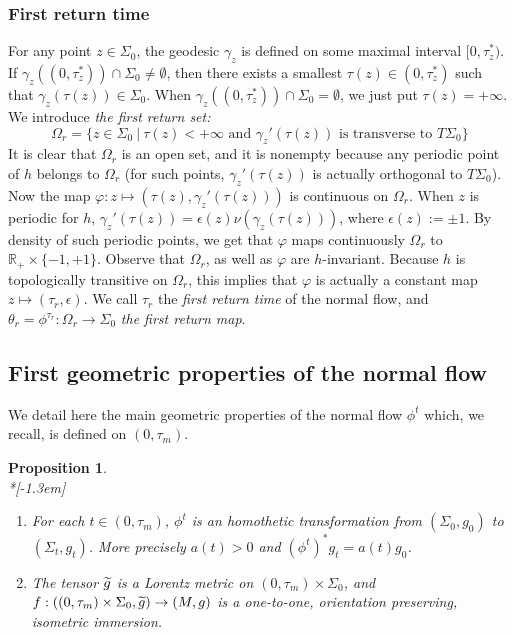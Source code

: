 \documentclass[11pt]{article}
\newtheorem{prop}[theo]{Proposition}
\theoremstyle{definition}
\numberwithin{equation}{section}
\numberwithin{figure}{section}
\numberwithin{table}{section}
\newcommand*\RR{\mathbb{R}}
\let\oldtilde\tilde
\renewcommand*\tilde[1]{\mathchoice{\widetilde{#1}}{\widetilde{#1}}{\widetilde{#1}}{\oldtilde{#1}}}
\begin{document}
\subsubsection{First return time}\label{sec.first}
For any point $z \in \Sigma_0$, the geodesic $\gamma_z$ is defined on some maximal interval $[0,\tau_z^*)$. If $\gamma_z((0,\tau_z^*)) \cap \Sigma_0 \not = \emptyset$, then there exists a smallest $\tau(z) \in (0,\tau_z^*)$ such that $\gamma_z(\tau(z)) \in \Sigma_0$. When $\gamma_z((0,\tau_z^*)) \cap \Sigma_0 = \emptyset$, we just put $\tau(z)=+ \infty$. We introduce \emph{the first return set:}
\[
\Omega_r= \{ z \in \Sigma_0\ | \ \tau(z)<+ \infty \text{ and } \gamma_z'(\tau(z)) \text{ is transverse to }T\Sigma_0 \}
\]
It is clear that $\Omega_r$ is an open set, and it is nonempty because any periodic point of $h$ belongs to $\Omega_r$ (for such points, $\gamma_z'(\tau(z))$ is actually orthogonal to $T\Sigma_0$). Now the map $\varphi: z \mapsto (\tau(z), \gamma_z'(\tau(z)))$ is continuous on $\Omega_r$. When $z$ is periodic for $h$, $\gamma_z'(\tau(z))=\epsilon(z) \nu(\gamma_z(\tau(z)))$, where $\epsilon(z):=\pm 1$. By density of such periodic points, we get that $\varphi$ maps continuously $\Omega_r$ to $\RR_+ \times \{-1,+1\}$. Observe that $\Omega_r$, as well as $\varphi$ are $h$-invariant. Because $h$ is topologically transitive on $\Omega_r$, this implies that $\varphi$ is actually a constant map $z \mapsto (\tau_r,\epsilon)$. We call $\tau_r$ the \emph{first return time} of the normal flow, and $\theta_r=\phi^{\tau_r}: \Omega_r \to \Sigma_0$ \emph{the first return map}.



\subsection{First geometric properties of the normal flow}\label{sec.geometric.properties}
We detail here the main geometric properties of the normal flow $\phi^t$ which, we recall, is defined on $(0,\tau_m)$.


\begin{prop}\label{fact.lorentz}\ \\*[-1.3em]
\begin{enumerate}
\item \label{5.5.1}For each $t \in (0,\tau_m)$, $\phi^t$ is an homothetic transformation from $(\Sigma_0,g_0)$ to $(\Sigma_t,g_t)$. More precisely $a(t)>0$ and $(\phi^t)^*g_t=a(t)g_0$.
\item \label{5.5.2}The tensor $\tilde{g}$ is a Lorentz metric on $(0,\tau_m) \times \Sigma_0$, and $f: ((0,\tau_m) \times \Sigma_0, \tilde{g}) \to (M,g)$ is a one-to-one, orientation preserving, isometric immersion.
\end{enumerate}
\end{prop}
\end{document}
